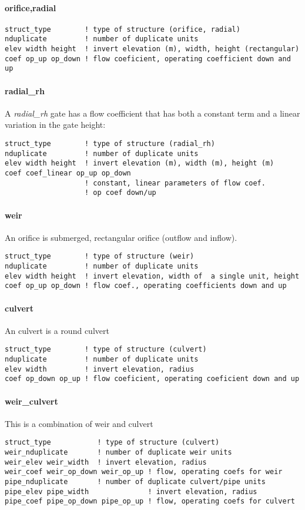 \paragraph{orifice,radial}
\begin{verbatim}
struct_type        ! type of structure (orifice, radial)
nduplicate         ! number of duplicate units
elev width height  ! invert elevation (m), width, height (rectangular)
coef op_up op_down ! flow coeficient, operating coefficient down and up
\end{verbatim}

\paragraph{radial\_rh}
A {\em radial\_rh} gate has a flow coefficient that has both
a constant term and a linear variation in the gate height:
\begin{verbatim}
struct_type        ! type of structure (radial_rh)
nduplicate         ! number of duplicate units
elev width height  ! invert elevation (m), width (m), height (m)
coef coef_linear op_up op_down 
                   ! constant, linear parameters of flow coef.
                   ! op coef down/up
\end{verbatim}

\paragraph{weir}
An orifice is submerged, rectangular orifice (outflow and inflow). 
\begin{verbatim}
struct_type        ! type of structure (weir)
nduplicate         ! number of duplicate units
elev width height  ! invert elevation, width of  a single unit, height
coef op_up op_down ! flow coef., operating coefficients down and up
\end{verbatim}

\paragraph{culvert}
An culvert is a round culvert
\begin{verbatim}
struct_type        ! type of structure (culvert)
nduplicate         ! number of duplicate units
elev width         ! invert elevation, radius
coef op_down op_up ! flow coeficient, operating coeficient down and up
\end{verbatim}

\paragraph{weir\_culvert}
This is a combination of weir and culvert
\begin{verbatim}
struct_type           ! type of structure (culvert)
weir_nduplicate       ! number of duplicate weir units
weir_elev weir_width  ! invert elevation, radius
weir_coef weir_op_down weir_op_up ! flow, operating coefs for weir
pipe_nduplicate       ! number of duplicate culvert/pipe units
pipe_elev pipe_width              ! invert elevation, radius
pipe_coef pipe_op_down pipe_op_up ! flow, operating coefs for culvert
\end{verbatim}

